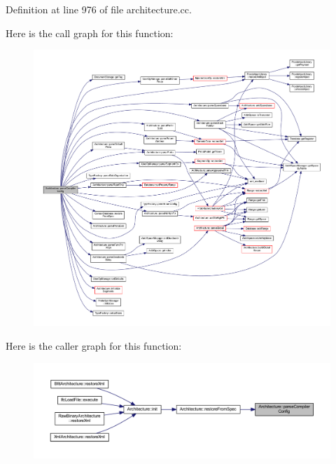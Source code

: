 Definition at line 976 of file architecture.\+cc.

Here is the call graph for this function\+:
\nopagebreak
\begin{figure}[H]
\begin{center}
\leavevmode
\includegraphics[width=350pt]{class_architecture_a20147b2a4be785c30ea29cc7d9278b42_cgraph}
\end{center}
\end{figure}
Here is the caller graph for this function\+:
\nopagebreak
\begin{figure}[H]
\begin{center}
\leavevmode
\includegraphics[width=350pt]{class_architecture_a20147b2a4be785c30ea29cc7d9278b42_icgraph}
\end{center}
\end{figure}
\mbox{\label{class_architecture_a29ad4de633bc630b03425ab46b31f42b}} 
